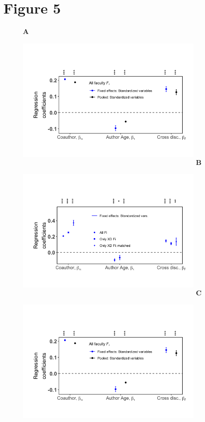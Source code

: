 \documentclass[10pt]{article}          %
\begin{document}
\section{Figure 5}
\begin{figure}[!htb]
    \textbf{A}\\
    \includegraphics[width=9.3cm, height=7cm]{5A.png}
  \endminipage\hfill
    \textbf{B}\\
    \includegraphics[width=9.3cm, height=7cm]{5B.png}
  \endminipage\hfill
    \textbf{C}\\
    \includegraphics[width=9.3cm, height=7cm]{5A.png}

\end{figure}
\end{document}
